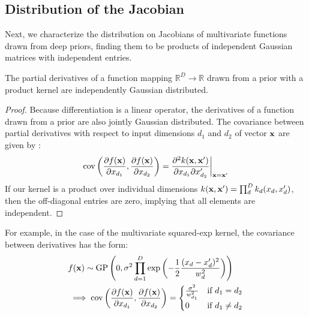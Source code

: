 \subsection{Distribution of the Jacobian}
\label{sec:theorem}
Next, we characterize the distribution on Jacobians of multivariate functions drawn from deep \gp{} priors, finding them to be products of independent Gaussian matrices with independent entries.

\begin{lemma}
\label{thm:deriv-ind}
The partial derivatives of a function mapping $\mathbb{R}^D \rightarrow \mathbb{R}$ drawn from a \gp{} prior with a product kernel are independently Gaussian distributed.
\end{lemma}
%
\begin{proof}
Because differentiation is a linear operator, the derivatives of a function drawn from a \gp{} prior are also jointly Gaussian distributed.
The covariance between partial derivatives with respect to input dimensions $d_1$ and $d_2$ of vector ${\bf{x}}$ are given by \citet{Solak03derivativeobservations}:
%
\begin{align}
\operatorname{cov} \left( \frac{\partial f({\bf{x}})}{\partial x_{d_1}}, \frac{\partial f({\bf{x}})}{\partial x_{d_2}} \right) 
= \frac{\partial^2 k({\bf{x}}, {\bf{x}}')}{\partial x_{d_1} \partial x_{d_2}'} \bigg|_{{\bf{x}}={\bf{x}}'}
\label{eq:deriv-kernel}
\end{align}
%
If our kernel is a product over individual dimensions $k({\bf{x}}, {\bf{x}}') = \prod_d^D k_d(x_d, x_d')$, 
then the off-diagonal entries are zero, implying that all elements are independent.
\end{proof}

For example, in the case of the multivariate squared-exp kernel, the covariance between derivatives has the form:
%
\begin{align}
& f({\bf{x}}) \sim \textnormal{GP}\left( 0, 
\sigma^2 \prod_{d=1}^D \exp \left(-\frac{1}{2} \frac{(x_d - x_d')^2}{w_d^2} \right) \right) \nonumber \\
& \implies 
\operatorname{cov} \left( \frac{\partial f({\bf{x}})}{\partial x_{d_1}}, \frac{\partial f({\bf{x}})}{\partial x_{d_2}} \right) =
\begin{cases} 
\frac{\sigma^2}{w_{d_1}^2} & \mbox{if } d_1 = d_2 \\ 
0 & \mbox{if } d_1 \neq d_2 \end{cases}
\end{align}


